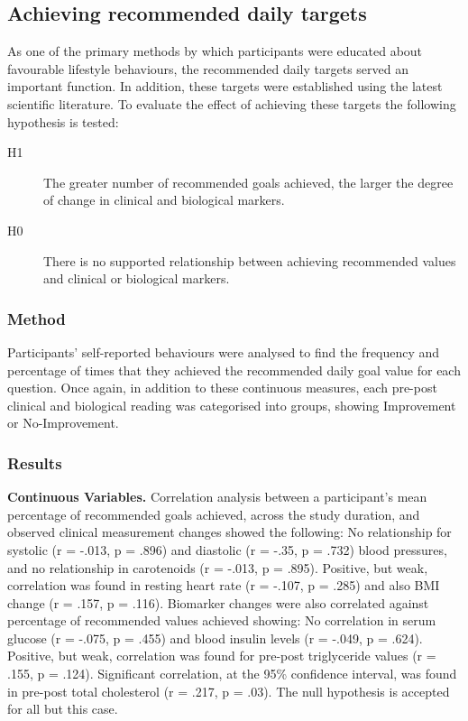 \subsection{Achieving recommended daily targets}
As one of the primary methods by which participants were educated about favourable lifestyle behaviours, the recommended daily targets served an important function. In addition, these targets were established using the latest scientific literature. To evaluate the effect of achieving these targets the following hypothesis is tested:
\begin{description}
  \item[H1] The greater number of recommended goals achieved, the larger the degree of change in clinical and biological markers.
  \item[H0] There is no supported relationship between achieving recommended values and clinical or biological markers.
\end{description}

\subsubsection{Method}
Participants’ self-reported behaviours were analysed to find the frequency and percentage of times that they achieved the recommended daily goal value for each question. Once again, in addition to these continuous measures, each pre-post clinical and biological reading was categorised into groups, showing Improvement or No-Improvement.

\subsubsection{Results}
\textbf{Continuous Variables.}
Correlation analysis between a participant’s mean percentage of recommended goals achieved, across the study duration, and observed clinical measurement changes showed the following: No relationship for systolic (r = -.013, p = .896) and diastolic (r = -.35, p = .732) blood pressures, and no relationship in carotenoids (r = -.013, p = .895). Positive, but weak, correlation was found in resting heart rate (r = -.107, p = .285) and also BMI change (r = .157, p = .116). Biomarker changes were also correlated against percentage of recommended values achieved showing: No correlation in serum glucose (r = -.075, p = .455) and blood insulin levels (r = -.049, p = .624). Positive, but weak, correlation was found for pre-post triglyceride values (r = .155, p = .124). Significant correlation, at the 95\% confidence interval, was found in pre-post total cholesterol (r = .217, p = .03). The null hypothesis is accepted for all but this case.

